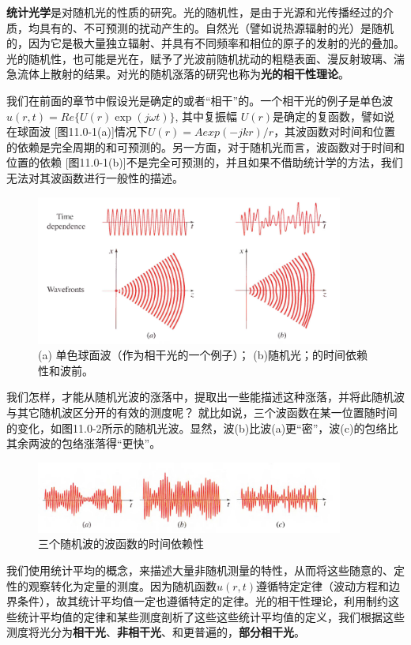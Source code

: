 \documentclass[UTF8]{ctexart}
\numberwithin{figure}{subsection}
\numberwithin{table}{subsection}
\begin{document}
\newpage\textbf{统计光学}是对随机光的性质的研究。光的随机性，是由于光源和光传播经过的介质，均具有的、不可预测的扰动产生的。自然光（譬如说热源辐射的光）是随机的，因为它是极大量独立辐射、并具有不同频率和相位的原子的发射的光的叠加。光的随机性，也可能是光在，赋予了光波前随机扰动的粗糙表面、漫反射玻璃、湍急流体上散射的结果。对光的随机涨落的研究也称为\textbf{光的相干性理论}。
\par 我们在前面的章节中假设光是确定的或者“相干”的。一个相干光的例子是单色波\\$ u(r,t) = Re \{ U(r) \exp(j\omega t) \}$, 其中复振幅 $ U(r) $是确定的复函数，譬如说在球面波 [图11.0-1(a)]情况下$ U(r) = Aexp(-jkr)/r $，其波函数对时间和位置的依赖是完全周期的和可预测的。另一方面，对于随机光而言，波函数对于时间和位置的依赖 [图11.0-1(b)]不是完全可预测的，并且如果不借助统计学的方法，我们无法对其波函数进行一般性的描述。
\begin{figure}[H]
\centering
\includegraphics[width=0.9\textwidth]{11_0_1.PNG}
\caption{(a) 单色球面波（作为相干光的一个例子）；
(b)随机光；的时间依赖性和波前。}
\label{fig: 11_0_1}
\end{figure}
\par 我们怎样，才能从随机光波的涨落中，提取出一些能描述这种涨落，并将此随机波与其它随机波区分开的有效的测度呢？ 就比如说，三个波函数在某一位置随时间的变化，如图11.0-2所示的随机光波。显然，波(b)比波(a)更“密”，波(c)的包络比其余两波的包络涨落得“更快”。 
\begin{figure}[ht]
\centering
\includegraphics[width=0.9\textwidth]{11_0_2.PNG}
\caption{三个随机波的波函数的时间依赖性}
\label{fig: 11_0_2}
\end{figure}
\par 我们使用统计平均的概念，来描述大量非随机测量的特性，从而将这些随意的、定性的观察转化为定量的测度。因为随机函数$ u(r,t) $遵循特定定律（波动方程和边界条件），故其统计平均值一定也遵循特定的定律。光的相干性理论，利用制约这些统计平均值的定律和某些测度剖析了这些这些统计平均值的定义，我们根据这些测度将光分为\textbf{相干光}、\textbf{非相干光}、和更普遍的，\textbf{部分相干光}。
\end{document}
